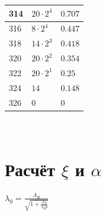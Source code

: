 \documentclass[a4paper, titlepage, 10pt]{article}
\begin{document}
\begin{minipage}{0.4\textwidth}
\begin{center}
\begin{tabular}{|l|l|l|}
  \hline
  314 & \( 20 \cdot 2^4 \) & \( 0.707 \) \\
  \hline
  316 & \( 8 \cdot 2^4 \) & \( 0.447 \) \\
  \hline
  318 & \( 14 \cdot 2^3 \) & \( 0.418 \) \\
  \hline
  320 & \( 20 \cdot 2^2 \) & \( 0.354 \) \\
  \hline
  322 & \( 20 \cdot 2^1 \) & \( 0.25 \) \\
  \hline
  324 & \( 14 \) & \( 0.148 \) \\
  \hline
  326 & \( 0 \) & \( 0 \) \\
  \hline
 \end{tabular}
\end{center}
\end{minipage}

\appendix
\section*{\\[1cm]Расчёт \( \xi\) и \(  \alpha \) }
\( \lambda_{0} = \frac{\Lambda_B}{\sqrt{1 + \frac{\Lambda_B}{\lambda_kp}} } \)
\end{document}
